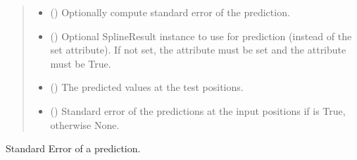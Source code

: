 \documentclass[letterpaper,10pt,english]{sphinxmanual}
\begin{document}
\begin{fulllineitems}
\begin{fulllineitems}
\begin{quote}
\begin{description}
\begin{itemize}
\item {}
\sphinxAtStartPar
{} () \textendash{} Optionally compute standard error of the prediction.

\item {}
\sphinxAtStartPar
{} () \textendash{} Optional SplineResult instance to use for prediction (instead of the
set  attribute). If not set, the  attribute must be
set and the  attribute must be True.

\end{itemize}

\sphinxAtStartPar
{}

\sphinxAtStartPar
\begin{itemize}
\item {}
\sphinxAtStartPar
{} () \textendash{} The predicted values at the test positions.

\item {}
\sphinxAtStartPar
{} () \textendash{} Standard error of the predictions at the input positions if
 is True, otherwise None.

\end{itemize}


\end{description}\end{quote}

\end{fulllineitems}


\begin{fulllineitems}
\label{\detokenize{splines:glomar_gridding.spline.ThinPlateSpline.standard_error}}
\pysigstartsignatures
\pysiglinewithargsret
{}
{\sphinxparamcomma {}}
{}
\pysigstopsignatures
\sphinxAtStartPar
Standard Error of a prediction.


\end{fulllineitems}
\end{fulllineitems}
\end{document}
